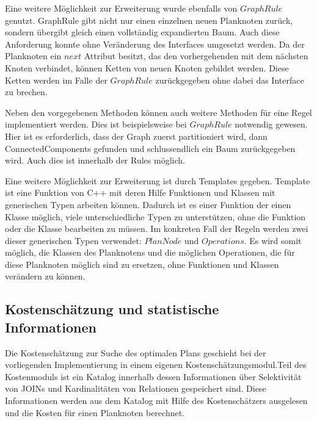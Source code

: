 Eine weitere Möglichkeit zur Erweiterung wurde ebenfalls von $GraphRule$ genutzt. GraphRule gibt nicht nur einen einzelnen neuen Planknoten zurück, sondern übergibt gleich einen vollständig expandierten Baum. Auch diese Anforderung konnte ohne Veränderung des Interfaces umgesetzt werden. Da der Planknoten ein $next$ Attribut besitzt, das den vorhergehenden mit dem nächsten Knoten verbindet, können Ketten von neuen Knoten gebildet werden. Diese Ketten werden im Falle der $GraphRule$ zurückgegeben ohne dabei das Interface zu brechen.

Neben den vorgegebenen  Methoden können auch weitere Methoden für eine Regel implementiert werden. Dies ist beispielsweise bei $GraphRule$ notwendig gewesen. Hier ist es erforderlich, dass der Graph zuerst partitioniert wird, dann ConnectedComponents gefunden und schlussendlich ein Baum zurückgegeben wird. Auch dies ist innerhalb der Rules möglich.

Eine weitere Möglichkeit zur Erweiterung ist durch Templates gegeben. Template ist eine Funktion von C++ mit deren Hilfe Funktionen und Klassen mit generischen Typen arbeiten können. Dadurch ist es einer Funktion der einen Klasse möglich, viele unterschiedliche Typen zu unterstützen, ohne die Funktion oder die Klasse bearbeiten zu müssen. Im konkreten Fall der Regeln werden zwei dieser generischen Typen verwendet: $PlanNode$ und $Operations$. Es wird somit möglich, die Klassen des Planknotens und die möglichen Operationen, die für diese Planknoten möglich sind zu ersetzen, ohne Funktionen und Klassen verändern zu können.



\subsection{Kostenschätzung und statistische Informationen}



Die Kostenschätzung zur Suche des optimalen Plans geschieht bei der vorliegenden Implementierung in einem eigenen Kostenschätzungsmodul.Teil des Kostenmoduls ist ein Katalog innerhalb dessen Informationen über Selektivität von JOINs und Kardinalitäten von Relationen gespeichert sind. Diese Informationen werden aus dem Katalog mit Hilfe des Kostenschätzers ausgelesen und die Kosten für einen Planknoten berechnet.

